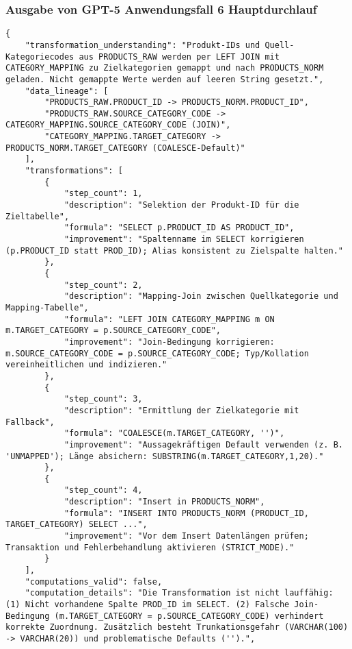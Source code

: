 \subsubsection{Ausgabe von GPT-5 Anwendungsfall 6 Hauptdurchlauf}\label{anhang:subsubsec:gpt_case6_prompt1}
\begin{lstlisting}[caption={Ausgabe: GPT-5 Anwendungsfall 6 Hauptdurchlauf},label={gpt_case6_prompt1}]
{
    "transformation_understanding": "Produkt-IDs und Quell-Kategoriecodes aus PRODUCTS_RAW werden per LEFT JOIN mit CATEGORY_MAPPING zu Zielkategorien gemappt und nach PRODUCTS_NORM geladen. Nicht gemappte Werte werden auf leeren String gesetzt.",
    "data_lineage": [
        "PRODUCTS_RAW.PRODUCT_ID -> PRODUCTS_NORM.PRODUCT_ID",
        "PRODUCTS_RAW.SOURCE_CATEGORY_CODE -> CATEGORY_MAPPING.SOURCE_CATEGORY_CODE (JOIN)",
        "CATEGORY_MAPPING.TARGET_CATEGORY -> PRODUCTS_NORM.TARGET_CATEGORY (COALESCE-Default)"
    ],
    "transformations": [
        {
            "step_count": 1,
            "description": "Selektion der Produkt-ID für die Zieltabelle",
            "formula": "SELECT p.PRODUCT_ID AS PRODUCT_ID",
            "improvement": "Spaltenname im SELECT korrigieren (p.PRODUCT_ID statt PROD_ID); Alias konsistent zu Zielspalte halten."
        },
        {
            "step_count": 2,
            "description": "Mapping-Join zwischen Quellkategorie und Mapping-Tabelle",
            "formula": "LEFT JOIN CATEGORY_MAPPING m ON m.TARGET_CATEGORY = p.SOURCE_CATEGORY_CODE",
            "improvement": "Join-Bedingung korrigieren: m.SOURCE_CATEGORY_CODE = p.SOURCE_CATEGORY_CODE; Typ/Kollation vereinheitlichen und indizieren."
        },
        {
            "step_count": 3,
            "description": "Ermittlung der Zielkategorie mit Fallback",
            "formula": "COALESCE(m.TARGET_CATEGORY, '')",
            "improvement": "Aussagekräftigen Default verwenden (z. B. 'UNMAPPED'); Länge absichern: SUBSTRING(m.TARGET_CATEGORY,1,20)."
        },
        {
            "step_count": 4,
            "description": "Insert in PRODUCTS_NORM",
            "formula": "INSERT INTO PRODUCTS_NORM (PRODUCT_ID, TARGET_CATEGORY) SELECT ...",
            "improvement": "Vor dem Insert Datenlängen prüfen; Transaktion und Fehlerbehandlung aktivieren (STRICT_MODE)."
        }
    ],
    "computations_valid": false,
    "computation_details": "Die Transformation ist nicht lauffähig: (1) Nicht vorhandene Spalte PROD_ID im SELECT. (2) Falsche Join-Bedingung (m.TARGET_CATEGORY = p.SOURCE_CATEGORY_CODE) verhindert korrekte Zuordnung. Zusätzlich besteht Trunkationsgefahr (VARCHAR(100) -> VARCHAR(20)) und problematische Defaults ('').",

\end{lstlisting}
